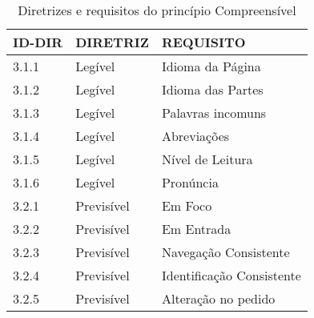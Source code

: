 \begin{table}[]
\center
\caption{Diretrizes e requisitos do princípio Compreensível}
\label{tab:compreensivelrobusto}
\begin{tabular}{lll}
\textbf{ID-DIR} & \textbf{DIRETRIZ}      & \textbf{REQUISITO}                                             \\
\hline
 3.1.1           & Legível                & Idioma da Página                                                                     \\
 
 3.1.2           & Legível                & Idioma das Partes                                                                   \\
 
 3.1.3           & Legível                & Palavras incomuns                                                                   \\
 
 3.1.4           & Legível                & Abreviações                                                                         \\
 
 3.1.5           & Legível                & Nível de Leitura                                                                    \\
 
 3.1.6           & Legível                & Pronúncia                                                                           \\
 
 3.2.1           & Previsível             & Em Foco                                                                              \\
 
 3.2.2           & Previsível             & Em Entrada                                                                           \\
 
 3.2.3           & Previsível             & Navegação Consistente                                                               \\
 
 3.2.4           & Previsível             & Identificação Consistente                                                           \\
 
 3.2.5           & Previsível             & Alteração no pedido                                                                 \\
 

\end{tabular}
\end{table}
